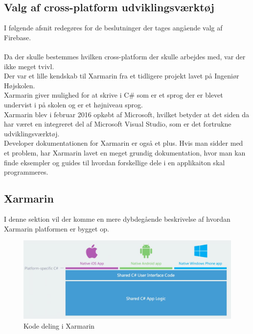 \subsection{Valg af cross-platform udviklingsværktøj}
I følgende afsnit redegøres for de beslutninger der tages angående valg af Firebase. \\ \\
Da der skulle bestemmes hvilken cross-platform der skulle arbejdes med, var der ikke meget tvivl. \\
Der var et lille kendskab til Xarmarin fra et tidligere projekt lavet på Ingeniør Højskolen. \\
Xarmarin giver mulighed for at skrive i C\# som er et sprog der er blevet undervist i på skolen og er et højniveau sprog. \\
Xarmarin blev i februar 2016 opkøbt af Microsoft, hvilket betyder at det siden da har været en integreret del af Microsoft Visual Studio, som er det fortrukne udviklingsværktøj.\\
Developer dokumentationen for Xarmarin er også et plus. Hvis man sidder med et problem, har Xarmarin lavet en meget grundig dokumentation, hvor man kan finde eksempler og guides til hvordan forskellige dele i en applikaiton skal programmeres.

\subsection{Xarmarin}
I denne sektion vil der komme en mere dybdegående beskrivelse af hvordan Xarmarin platformen er bygget op.



\begin{figure}[H]
	\centering
	\includegraphics[width=1\linewidth]{Applikation/XarmarinShare.JPG}
	\caption{Kode deling i Xarmarin}
	\label{fig:CodeShare}
\end{figure}

\clearpage